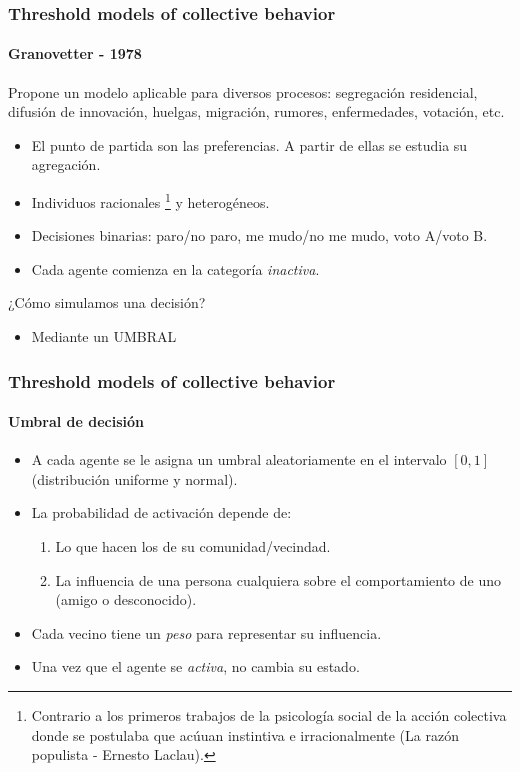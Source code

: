 \documentclass[11pt]{beamer}
\begin{document}
\begin{frame}
	\frametitle{Threshold models of collective behavior}
	\framesubtitle{Granovetter - 1978}
	Propone un modelo aplicable para diversos procesos: segregación residencial, difusión de innovación, huelgas, migración, rumores, enfermedades, votación, etc.
	\begin{itemize}
		\item El punto de partida son las preferencias. A partir de ellas se estudia su agregación.
		\item Individuos racionales
		\footnote{\scriptsize Contrario a los primeros trabajos de la psicología social de la acción colectiva donde se postulaba que acúuan instintiva e irracionalmente (La razón populista - Ernesto Laclau).} y heterogéneos.
		\item Decisiones binarias: paro/no paro, me mudo/no me mudo, voto A/voto B.
		\item Cada agente comienza en la categoría \textit{inactiva}.
	\end{itemize}
	\vspace{3mm}
	¿Cómo simulamos una decisión?
	\begin{itemize}
		\item<2-> Mediante un UMBRAL
	\end{itemize}
\end{frame}

\begin{frame}
	\frametitle{Threshold models of collective behavior}
	\framesubtitle{Umbral de decisión}
	\begin{itemize}
		\item A cada agente se le asigna un umbral aleatoriamente en el intervalo $[0,1]$ (distribución uniforme y normal).
		\item La probabilidad de activación depende de:
		\begin{enumerate}
			\item Lo que hacen los de su comunidad/vecindad.
			\item La influencia de una persona cualquiera sobre el comportamiento de uno (amigo o desconocido).
		\end{enumerate}
		\item Cada vecino tiene un \textit{peso} para representar su influencia.
		\item Una vez que el agente se \textit{activa}, no cambia su estado.
	\end{itemize}
\end{frame}
\end{document}

